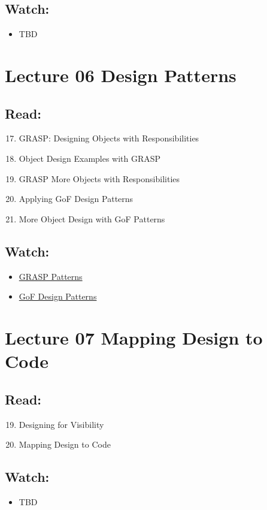 \documentclass[10pt,t,a4paper]{article}
\begin{document}
\subsection{Watch:}
\label{sec:orgheadline17}
\begin{itemize}
\item TBD
\end{itemize}
\section{Lecture 06 Design Patterns}
\label{sec:orgheadline21}
\subsection{Read:}
\label{sec:orgheadline19}
\begin{enumerate}
\setcounter{enumi}{16}
\item GRASP: Designing Objects with Responsibilities
\item Object Design Examples with GRASP
\setcounter{enumi}{24}
\item GRASP More Objects with Responsibilities
\item Applying GoF Design Patterns
\setcounter{enumi}{35}
\item More Object Design with GoF Patterns
\end{enumerate}

\subsection{Watch:}
\label{sec:orgheadline20}
\begin{itemize}
\item \href{https://play.bth.se/media/DesignPatterns_GRASP/1_e4z8gitx}{GRASP Patterns}
\item \href{https://play.bth.se/media/DesignPatterns_GoF/1_xdlww0y6}{GoF Design Patterns}
\end{itemize}
\section{Lecture 07 Mapping Design to Code}
\label{sec:orgheadline24}
\subsection{Read:}
\label{sec:orgheadline22}
\begin{enumerate}
\setcounter{enumi}{18}
\item Designing for Visibility
\item Mapping Design to Code
\end{enumerate}

\subsection{Watch:}
\label{sec:orgheadline23}
\begin{itemize}
\item TBD
\end{itemize}
\end{document}
